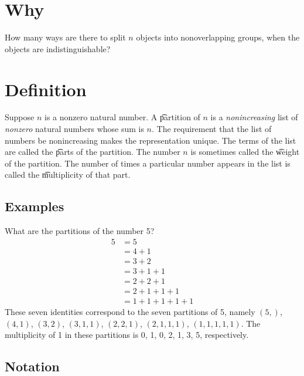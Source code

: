 

\section*{Why}

How many ways are there to split $n$ objects into nonoverlapping groups, when the objects are indistinguishable?

\section*{Definition}

Suppose $n$ is a nonzero natural number.
A \t{partition} of $n$ is a \textit{nonincreasing} list of \textit{nonzero} natural numbers whose sum is $n$.
The requirement that the list of numbers be nonincreasing makes the representation unique.
The terms of the list are called the \t{parts} of the partition.
The number $n$ is sometimes called the \t{weight} of the partition.
The number of times a particular number appears in the list is called the \t{multiplicity} of that part.

\subsection*{Examples}

What are the partitions of the number 5?
    \[
\begin{aligned}
5
&= 5 \\
&= 4 + 1 \\
&= 3 + 2 \\
&= 3 + 1 + 1 \\
&= 2 + 2 + 1 \\
&= 2 + 1 + 1 + 1 \\
&= 1 + 1 + 1 + 1 + 1
\end{aligned}
    \]
These seven identities correspond to the seven partitions of 5, namely $(5,)$, $(4, 1)$, $(3, 2)$, $(3,1,1)$, $(2,2,1)$, $(2,1,1,1)$, $(1,1,1,1,1)$.
The multiplicity of 1 in these partitions is 0, 1, 0, 2, 1, 3, 5, respectively.

\subsection*{Notation}

